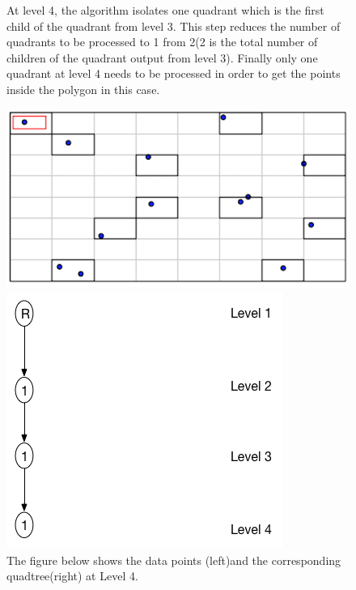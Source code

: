 \documentclass{article}
\begin{document}
\begin{figure}[ht]
At level 4, the algorithm isolates one quadrant which is the first child of the quadrant from level 3.
This step reduces the number of quadrants to be processed to 1 from 2(2 is the total number of children of the quadrant output from level 3).
Finally only one quadrant at level 4 needs to be processed in order to get the points inside the polygon in this case.
\caption{The figure below shows the data points (left)and the corresponding quadtree(right) at Level 4.}
  \centering
  \begin{minipage}[b]{0.35\textwidth}
    \includegraphics[width=\textwidth]{1_1Quad1_4}  
  \end{minipage}
  \hfill
  \begin{minipage}[b]{0.5\textwidth}
    \includegraphics[width=\textwidth]{1Quad_4_tree}
  \end{minipage}
\end{figure}
\end{document}
